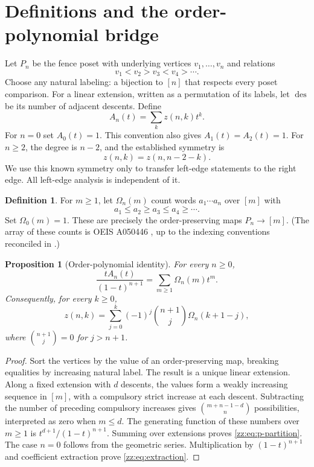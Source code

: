 \documentclass[11pt,a4paper]{article}
\newtheorem{proposition}[theorem]{Proposition}
\theoremstyle{definition}
\newtheorem{definition}[theorem]{Definition}
\newcommand{\Om}{\Omega}
\DeclareMathOperator{\des}{des}
\begin{document}
\section{Definitions and the order-polynomial bridge}
\label{zz:sec:definitions}
Let $P_n$ be the fence poset with underlying vertices
$v_1,\ldots,v_n$ and relations
\[
 v_1<v_2>v_3<v_4>\cdots.
\]
Choose any natural labeling: a bijection to $[n]$ that respects every poset
comparison.  For a linear extension, written as a permutation of its labels,
let $\des$ be its number of adjacent descents.  Define
\[
 A_n(t)=\sum_k z(n,k)t^k.
\]
For $n=0$ set $A_0(t)=1$.  This convention also gives
$A_1(t)=A_2(t)=1$.  For $n\ge2$, the degree is $n-2$, and the established
symmetry is
\begin{equation}\label{zz:eq:symmetry}
 z(n,k)=z(n,n-2-k).
\end{equation}
We use this known symmetry only to transfer left-edge statements to the
right edge.  All left-edge analysis is independent of it.

\begin{definition}
For $m\ge1$, let $\Om_n(m)$ count words $a_1\cdots a_n$ over $[m]$ with
\[
 a_1\le a_2\ge a_3\le a_4\ge\cdots.
\]
Set $\Om_0(m)=1$.  These are precisely the order-preserving maps
$P_n\to[m]$.  (The array of these counts is OEIS A050446 \cite{oeis50446},
up to the indexing conventions reconciled in \cite{pz,xz}.)
\end{definition}

\begin{proposition}[Order-polynomial identity]
\label{zz:prop:p-partitions}
For every $n\ge0$,
\begin{equation}\label{zz:eq:p-partition}
 \frac{tA_n(t)}{(1-t)^{n+1}}=\sum_{m\ge1}\Om_n(m)t^m.
\end{equation}
Consequently, for every $k\ge0$,
\begin{equation}\label{zz:eq:extraction}
 z(n,k)=\sum_{j=0}^{k}(-1)^j\binom{n+1}{j}\Om_n(k+1-j),
\end{equation}
where $\binom{n+1}{j}=0$ for $j>n+1$.
\end{proposition}
\begin{proof}
Sort the vertices by the value of an order-preserving map, breaking equalities
by increasing natural label.  The result is a unique linear extension.
Along a fixed extension with $d$ descents, the values form a weakly increasing
sequence in $[m]$, with a compulsory strict increase at each descent.
Subtracting the number of preceding compulsory increases gives
$\binom{m+n-1-d}{n}$ possibilities, interpreted as zero when $m\le d$.
The generating function of these numbers over $m\ge1$ is
$t^{d+1}/(1-t)^{n+1}$.  Summing over extensions proves
\eqref{zz:eq:p-partition}.  The case $n=0$ follows from the geometric series.
Multiplication by $(1-t)^{n+1}$ and coefficient extraction prove
\eqref{zz:eq:extraction}.
\end{proof}
\end{document}
